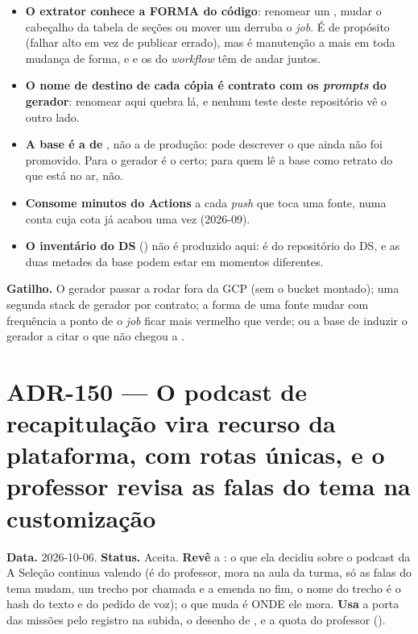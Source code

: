 \begin{itemize}
  \item \textbf{O extrator conhece a FORMA do código}: renomear um
    , mudar o cabeçalho da tabela de seções ou mover um
     derruba o \emph{job}. É de propósito (falhar alto em vez de
    publicar errado), mas é manutenção a mais em toda mudança de forma, e
     e os  do \emph{workflow} têm de andar juntos.
  \item \textbf{O nome de destino de cada cópia é contrato com os
    \emph{prompts} do gerador}: renomear aqui quebra lá, e nenhum teste deste
    repositório vê o outro lado.
  \item \textbf{A base é a de }, não a de produção: pode descrever
    o que ainda não foi promovido. Para o gerador é o certo; para quem lê a base
    como retrato do que está no ar, não.
  \item \textbf{Consome minutos do Actions} a cada \emph{push} que toca uma
    fonte, numa conta cuja cota já acabou uma vez (2026-09).
  \item \textbf{O inventário do DS} ()
    não é produzido aqui: é do repositório do DS, e as duas metades da base
    podem estar em momentos diferentes.
\end{itemize}

\textbf{Gatilho.} O gerador passar a rodar fora da GCP (sem o bucket montado);
uma segunda stack de gerador por contrato; a forma de uma fonte mudar com
frequência a ponto de o \emph{job} ficar mais vermelho que verde; ou a base de
 induzir o gerador a citar o que não chegou a .

\section{ADR-150 --- O podcast de recapitulação vira recurso da plataforma, com rotas únicas, e o professor revisa as falas do tema na customização}
\label{adr:podcast-da-plataforma}

\textbf{Data.} 2026-10-06. \textbf{Status.} Aceita. \textbf{Revê} a
: o que ela decidiu sobre o podcast da A Seleção continua
valendo (é do professor, mora na aula da turma, só as falas do tema mudam, um
trecho por chamada e a emenda no fim, o nome do trecho é o hash do texto e do
pedido de voz); o que muda é ONDE ele mora. \textbf{Usa} a porta das missões
pelo registro na subida, o desenho de ,
e a quota do professor ().

